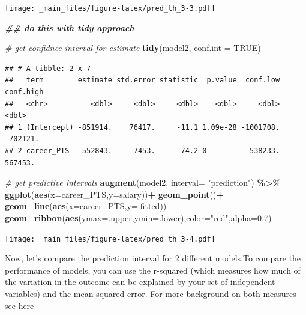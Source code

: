 \documentclass[
]{book}
\newenvironment{Shaded}{\begin{snugshade}}{\end{snugshade}}
\newcommand{\AttributeTok}[1]{\textcolor[rgb]{0.13,0.29,0.53}{#1}}
\newcommand{\CommentTok}[1]{\textcolor[rgb]{0.56,0.35,0.01}{\textit{#1}}}
\newcommand{\ConstantTok}[1]{\textcolor[rgb]{0.56,0.35,0.01}{#1}}
\newcommand{\DocumentationTok}[1]{\textcolor[rgb]{0.56,0.35,0.01}{\textbf{\textit{#1}}}}
\newcommand{\FloatTok}[1]{\textcolor[rgb]{0.00,0.00,0.81}{#1}}
\newcommand{\FunctionTok}[1]{\textcolor[rgb]{0.13,0.29,0.53}{\textbf{#1}}}
\newcommand{\NormalTok}[1]{#1}
\newcommand{\SpecialCharTok}[1]{\textcolor[rgb]{0.81,0.36,0.00}{\textbf{#1}}}
\newcommand{\StringTok}[1]{\textcolor[rgb]{0.31,0.60,0.02}{#1}}
\begin{document}
\texttt{[image: \_main\_files/figure-latex/pred\_th\_3-3.pdf]}

\begin{Shaded}
\begin{Highlighting}[]
\DocumentationTok{\#\# do this with tidy approach}

\CommentTok{\# get confidnce interval for estimate}
\FunctionTok{tidy}\NormalTok{(model2, }\AttributeTok{conf.int =} \ConstantTok{TRUE}\NormalTok{)}
\end{Highlighting}
\end{Shaded}

\begin{verbatim}
## # A tibble: 2 x 7
##   term        estimate std.error statistic  p.value  conf.low conf.high
##   <chr>          <dbl>     <dbl>     <dbl>    <dbl>     <dbl>     <dbl>
## 1 (Intercept) -851914.    76417.     -11.1 1.09e-28 -1001708.  -702121.
## 2 career_PTS   552843.     7453.      74.2 0          538233.   567453.
\end{verbatim}

\begin{Shaded}
\begin{Highlighting}[]
\CommentTok{\# get predictive intervals}
\FunctionTok{augment}\NormalTok{(model2, }\AttributeTok{interval=} \StringTok{"prediction"}\NormalTok{) }\SpecialCharTok{\%\textgreater{}\%}
  \FunctionTok{ggplot}\NormalTok{(}\FunctionTok{aes}\NormalTok{(}\AttributeTok{x=}\NormalTok{career\_PTS,}\AttributeTok{y=}\NormalTok{salary))}\SpecialCharTok{+}
  \FunctionTok{geom\_point}\NormalTok{()}\SpecialCharTok{+}
  \FunctionTok{geom\_line}\NormalTok{(}\FunctionTok{aes}\NormalTok{(}\AttributeTok{x=}\NormalTok{career\_PTS,}\AttributeTok{y=}\NormalTok{.fitted))}\SpecialCharTok{+}
  \FunctionTok{geom\_ribbon}\NormalTok{(}\FunctionTok{aes}\NormalTok{(}\AttributeTok{ymax=}\NormalTok{.upper,}\AttributeTok{ymin=}\NormalTok{.lower),}\AttributeTok{color=}\StringTok{"red"}\NormalTok{,}\AttributeTok{alpha=}\FloatTok{0.7}\NormalTok{)}
\end{Highlighting}
\end{Shaded}

\texttt{[image: \_main\_files/figure-latex/pred\_th\_3-4.pdf]}

Now, let's compare the prediction interval for 2 different models.To compare the performance of models, you can use the r-squared (which measures how much of the variation in the outcome can be explained by your set of independent variables) and the mean squared error. For more background on both measures see \href{https://vitalflux.com/mean-square-error-r-squared-which-one-to-use/}{here}
\end{document}
